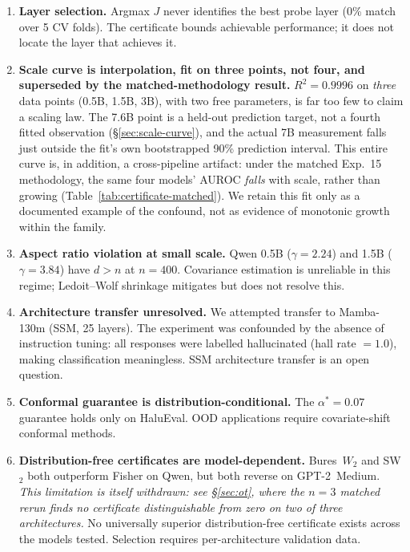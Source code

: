 \documentclass[onecolumn]{jmlr}
\begin{document}
\begin{enumerate}[leftmargin=*, topsep=2pt, itemsep=2pt]
\item \textbf{Layer selection.}  Argmax $J$ never identifies the best
  probe layer (0\% match over 5 CV folds).  The certificate bounds
  achievable performance; it does not locate the layer that achieves it.

\item \textbf{Scale curve is interpolation, fit on three points, not
  four, and superseded by the matched-methodology result.}
  $R^2 = 0.9996$ on \emph{three} data points (0.5B, 1.5B, 3B), with two
  free parameters, is far too few to claim a scaling law. The 7.6B
  point is a held-out prediction target, not a fourth fitted
  observation (\S\ref{sec:scale-curve}), and the actual 7B measurement
  falls just outside the fit's own bootstrapped 90\% prediction
  interval. This entire curve is, in addition, a cross-pipeline
  artifact: under the matched Exp.~15 methodology, the same four
  models' AUROC \emph{falls} with scale, rather than growing
  (Table~\ref{tab:certificate-matched}). We retain this fit only as a
  documented example of the confound, not as evidence of monotonic
  growth within the family.

\item \textbf{Aspect ratio violation at small scale.}  Qwen 0.5B
  ($\gamma = 2.24$) and 1.5B ($\gamma = 3.84$) have $d > n$ at $n = 400$.
  Covariance estimation is unreliable in this regime; Ledoit--Wolf
  shrinkage mitigates but does not resolve this.

\item \textbf{Architecture transfer unresolved.} We attempted transfer
  to Mamba-130m (SSM, 25 layers). The experiment was confounded by the
  absence of instruction tuning: all responses were labelled
  hallucinated (hall rate $= 1.0$), making classification meaningless.
  SSM architecture transfer is an open question.

\item \textbf{Conformal guarantee is distribution-conditional.}  The
  $\alpha^* = 0.07$ guarantee holds only on HaluEval.  OOD applications
  require covariate-shift conformal methods.

\item \textbf{Distribution-free certificates are model-dependent.}
  Bures~$W_2$ and SW$_2$ both outperform Fisher on Qwen, but both
  reverse on GPT-2~Medium. \emph{This limitation is itself withdrawn: see
  \S\ref{sec:ot}, where the $n{=}3$ matched rerun finds no certificate
  distinguishable from zero on two of three architectures.} No universally superior distribution-free
  certificate exists across the models tested. Selection requires
  per-architecture validation data.


\end{enumerate}
\end{document}
